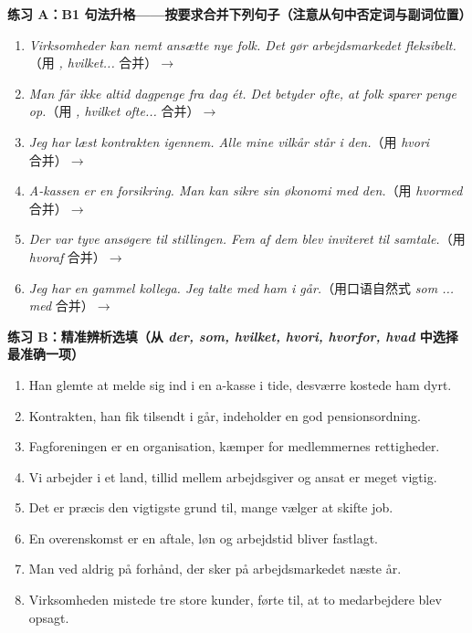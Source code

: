 
\textbf{练习 A：B1 句法升格——按要求合并下列句子（注意从句中否定词与副词位置）}
\begin{enumerate}
  \item \textit{Virksomheder kan nemt ansætte nye folk. Det gør arbejdsmarkedet fleksibelt.}（用 \textit{, hvilket...} 合并）$\rightarrow$
  \item \textit{Man får ikke altid dagpenge fra dag ét. Det betyder ofte, at folk sparer penge op.}（用 \textit{, hvilket ofte...} 合并）$\rightarrow$
  \item \textit{Jeg har læst kontrakten igennem. Alle mine vilkår står i den.}（用 \textit{hvori} 合并）$\rightarrow$
  \item \textit{A-kassen er en forsikring. Man kan sikre sin økonomi med den.}（用 \textit{hvormed} 合并）$\rightarrow$
  \item \textit{Der var tyve ansøgere til stillingen. Fem af dem blev inviteret til samtale.}（用 \textit{hvoraf} 合并）$\rightarrow$
  \item \textit{Jeg har en gammel kollega. Jeg talte med ham i går.}（用口语自然式 \textit{som ... med} 合并）$\rightarrow$
\end{enumerate}

\textbf{练习 B：精准辨析选填（从 \textit{der, som, hvilket, hvori, hvorfor, hvad} 中选择最准确一项）}
\begin{enumerate}
  \item Han glemte at melde sig ind i en a-kasse i tide, \underline{\hspace{2.2cm}} desværre kostede ham dyrt.
  \item Kontrakten, \underline{\hspace{2.2cm}} han fik tilsendt i går, indeholder en god pensionsordning.
  \item Fagforeningen er en organisation, \underline{\hspace{2.2cm}} kæmper for medlemmernes rettigheder.
  \item Vi arbejder i et land, \underline{\hspace{2.2cm}} tillid mellem arbejdsgiver og ansat er meget vigtig.
  \item Det er præcis den vigtigste grund til, \underline{\hspace{2.2cm}} mange vælger at skifte job.
  \item En overenskomst er en aftale, \underline{\hspace{2.2cm}} løn og arbejdstid bliver fastlagt.
  \item Man ved aldrig på forhånd, \underline{\hspace{2.2cm}} der sker på arbejdsmarkedet næste år.
  \item Virksomheden mistede tre store kunder, \underline{\hspace{2.2cm}} førte til, at to medarbejdere blev opsagt.
\end{enumerate}

